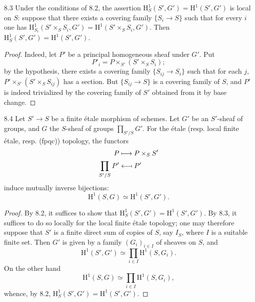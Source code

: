 \begin{lemma}{8.3}\label{XXIV.8.3}
Under the conditions of 8.2, the assertion $\mathrm H^1_S(S',G')=\mathrm H^1(S',G')$ is local on $S$: suppose that there exists a covering family $\{S_i\to S\}$ such that for every $i$ one has $\mathrm H^1_{S_i}(S'\times_S S_i,G')=\mathrm H^1(S'\times_S S_i,G')$. Then $\mathrm H^1_S(S',G')=\mathrm H^1(S',G')$.
\end{lemma}
\begin{proof}
Indeed, let $P'$ be a principal homogeneous sheaf under $G'$. Put
\[
P'_i=P\times_{S'}(S'\times_S S_i);
\]
by the hypothesis, there exists a covering family $\{S_{ij}\to S_i\}$ such that for each $j$, $P'\times_{S'}(S'\times_S S_{ij})$ has a section. But $\{S_{ij}\to S\}$ is a covering family of $S$, and $P'$ is indeed trivialized by the covering family of $S'$ obtained from it by base change.
\end{proof}
\begin{proposition}{8.4}\label{XXIV.8.4}
Let $S'\to S$ be a finite étale morphism of schemes. Let $G'$ be an $S'$-sheaf of groups, and $G$ the $S$-sheaf of groups $\prod_{S'/S}G'$. For the étale (resp. local finite étale, resp. (fpqc)) topology, the functors
\[
\begin{aligned}
P&\mto P\times_S S'\\
\prod_{S'/S}P'&\mathrel{\reflectbox{$\longmapsto$}} P'
\end{aligned}
\]
induce mutually inverse bijections:
\[
\mathrm H^1(S,G)\simeq\mathrm H^1(S',G').
\]
\end{proposition}
\begin{proof}
By 8.2, it suffices to show that $\mathrm H^1_S(S',G')=\mathrm H^1(S',G')$. By 8.3, it suffices to do so locally for the local finite étale topology; one may therefore suppose that $S'$ is a finite direct sum of copies of $S$, say $I_S$, where $I$ is a suitable finite set. Then $G'$ is given by a family $(G_i)_{i\in I}$ of sheaves on $S$, and
\[
\mathrm H^1(S',G')\simeq\prod_{i\in I}\mathrm H^1(S,G_i).
\]
On the other hand
\[
\mathrm H^1(S,G)\simeq\prod_{i\in I}\mathrm H^1(S,G_i),
\]
whence, by 8.2, $\mathrm H^1_S(S',G')=\mathrm H^1(S',G')$.
\end{proof}
